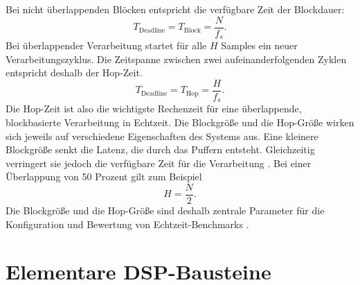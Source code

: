 Bei nicht überlappenden Blöcken entspricht die verfügbare Zeit der Blockdauer:
\begin{equation}
	T_{\mathrm{Deadline}} = T_{\mathrm{Block}} = \frac{N}{f_s}.
\end{equation}
Bei überlappender Verarbeitung startet für alle $H$ Samples ein neuer Verarbeitungszyklus. Die Zeitspanne zwischen zwei aufeinanderfolgenden Zyklen entspricht deshalb der Hop-Zeit.
\begin{equation}
	T_{\mathrm{Deadline}} = T_{\mathrm{Hop}} = \frac{H}{f_s}.
\end{equation}
\noindent Die Hop-Zeit ist also die wichtigste Rechenzeit für eine überlappende, blockbasierte Verarbeitung in Echtzeit.
Die Blockgröße und die Hop-Größe wirken sich jeweils auf verschiedene Eigenschaften des Systems aus. Eine kleinere Blockgröße senkt die Latenz, die durch das Puffern entsteht. Gleichzeitig verringert sie jedoch die verfügbare Zeit für die Verarbeitung \parencite[S. 499, 500, 761]{tan2018digital}. Bei einer Überlappung von 50 Prozent gilt zum Beispiel
\begin{equation}
	H = \frac{N}{2}. 
\end{equation}
\noindent Die Blockgröße und die Hop-Größe sind deshalb zentrale Parameter für die Konfiguration und Bewertung von Echtzeit-Benchmarks \parencite{zolzer2022digital}.
\section{Elementare DSP-Bausteine}
\label{sec:dsp-bausteine}
